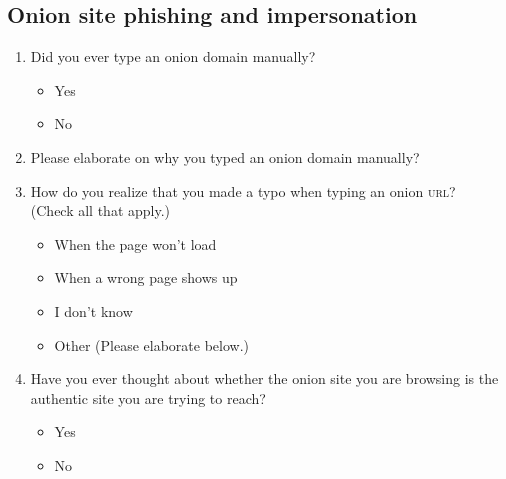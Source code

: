 \subsection{Onion site phishing and impersonation}
\begin{enumerate}
    \item Did you ever type an onion domain manually?
        \begin{itemize}[label=$\Circle$]
            \item Yes
            \item No
        \end{itemize}

    \item Please elaborate on why you typed an onion domain manually?

    \item How do you realize that you made a typo when typing an onion
        \textsc{url}?\\(Check all that apply.)
        \begin{itemize}[label=$\Square$]
            \item When the page won't load
            \item When a wrong page shows up
            \item I don't know
            \item Other (Please elaborate below.)
        \end{itemize}

    \item Have you ever thought about whether the onion site you are browsing
        is the authentic site you are trying to reach?
        \begin{itemize}[label=$\Circle$]
            \item Yes
            \item No
        \end{itemize}


\end{enumerate}
